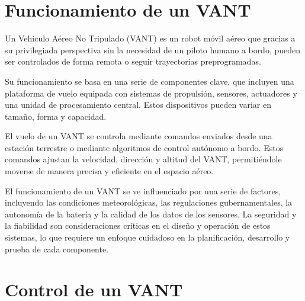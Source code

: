 \section{Funcionamiento de un VANT}

Un Vehículo Aéreo No Tripulado (VANT) es un robot móvil aéreo que gracias a su privilegiada perspectiva sin la necesidad de un piloto humano a bordo, pueden ser controlados de forma remota o seguir trayectorias preprogramadas.

Su funcionamiento se basa en una serie de componentes clave, que incluyen una plataforma de vuelo equipada con sistemas de propulsión, sensores, actuadores y una unidad de procesamiento central. Estos dispositivos pueden variar en tamaño, forma y capacidad.


El vuelo de un VANT se controla mediante comandos enviados desde una estación terrestre o mediante algoritmos de control autónomo a bordo. Estos comandos ajustan la velocidad, dirección y altitud del VANT, permitiéndole moverse de manera precisa y eficiente en el espacio aéreo.

El funcionamiento de un VANT se ve influenciado por una serie de factores, incluyendo las condiciones meteorológicas, las regulaciones gubernamentales, la autonomía de la batería y la calidad de los datos de los sensores. La seguridad y la fiabilidad son consideraciones críticas en el diseño y operación de estos sistemas, lo que requiere un enfoque cuidadoso en la planificación, desarrollo y prueba de cada componente.


\section{Control de un VANT}


